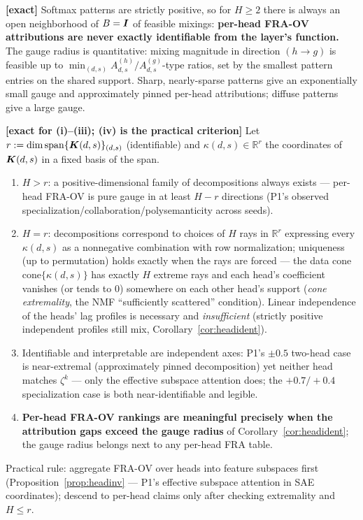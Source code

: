 \documentclass{article}
\begin{document}
\begin{corollary}\label{cor:headident}
\textbf{[exact]} Softmax patterns are strictly positive, so for $H \ge 2$ there is always an open neighborhood of $B = \boldsymbol{I}$ of feasible mixings: \textbf{per-head FRA-OV attributions are never exactly identifiable from the layer's function.} The gauge radius is quantitative: mixing magnitude in direction $(h \to g)$ is feasible up to $\min_{(d,s)} A^{(h)}_{d,s}/A^{(g)}_{d,s}$-type ratios, set by the smallest pattern entries on the shared support. Sharp, nearly-sparse patterns give an exponentially small gauge and approximately pinned per-head attributions; diffuse patterns give a large gauge.
\end{corollary}

\begin{prop}\label{prop:headcond}
\textbf{[exact for (i)--(iii); (iv) is the practical criterion]} Let $r := \dim\mathrm{span}\{\boldsymbol{K}(d,s)\}_{(d,s)}$ (identifiable) and $\kappa(d,s) \in \mathbb{R}^r$ the coordinates of $\boldsymbol{K}(d,s)$ in a fixed basis of the span.
\begin{enumerate}
    \item $H > r$: a positive-dimensional family of decompositions always exists --- per-head FRA-OV is pure gauge in at least $H - r$ directions (P1's observed specialization/collaboration/polysemanticity across seeds).
    \item $H = r$: decompositions correspond to choices of $H$ rays in $\mathbb{R}^r$ expressing every $\kappa(d,s)$ as a nonnegative combination with row normalization; uniqueness (up to permutation) holds exactly when the rays are forced --- the data cone $\mathrm{cone}\{\kappa(d,s)\}$ has exactly $H$ extreme rays and each head's coefficient vanishes (or tends to $0$) somewhere on each other head's support (\emph{cone extremality}, the NMF ``sufficiently scattered'' condition). Linear independence of the heads' lag profiles is necessary and \emph{insufficient} (strictly positive independent profiles still mix, Corollary~\ref{cor:headident}).
    \item Identifiable and interpretable are independent axes: P1's $\pm0.5$ two-head case is near-extremal (approximately pinned decomposition) yet neither head matches $\zeta^k$ --- only the effective subspace attention does; the $+0.7/+0.4$ specialization case is both near-identifiable and legible.
    \item \textbf{Per-head FRA-OV rankings are meaningful precisely when the attribution gaps exceed the gauge radius} of Corollary~\ref{cor:headident}; the gauge radius belongs next to any per-head FRA table.
\end{enumerate}
Practical rule: aggregate FRA-OV over heads into feature subspaces first (Proposition~\ref{prop:headinv} --- P1's effective subspace attention in SAE coordinates); descend to per-head claims only after checking extremality and $H \le r$.
\end{prop}
\end{document}
